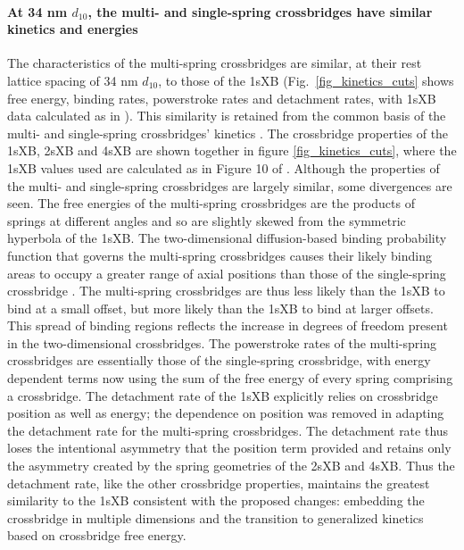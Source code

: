 \documentclass[]{article}
\begin{document}
\paragraph{At 34 nm $d_{10}$, the multi- and single-spring crossbridges have similar kinetics and energies} %
The characteristics of the multi-spring crossbridges are similar, at their rest lattice spacing of 34 nm $d_{10}$, to those of the 1sXB (Fig.~\ref{fig_kinetics_cuts} shows free energy, binding rates, powerstroke rates and detachment rates, with 1sXB data calculated as in \citet{Tanner2007}). 
This similarity is retained from the common basis of the multi- and single-spring crossbridges' kinetics \citep{Pate1989}.
The crossbridge properties of the 1sXB, 2sXB and 4sXB are shown together in figure \ref{fig_kinetics_cuts}, where the 1sXB values used are calculated as in Figure 10 of \citet{Tanner2007}. 
Although the properties of the multi- and single-spring crossbridges are largely similar, some divergences are seen. 
The free energies of the multi-spring crossbridges are the products of springs at different angles and so are slightly skewed from the symmetric hyperbola of the 1sXB.
The two-dimensional diffusion-based binding probability function that governs the multi-spring crossbridges causes their likely binding areas to occupy a greater range of axial positions than those of the single-spring crossbridge \citep{BergBook, DillBook}.
The multi-spring crossbridges are thus less likely than the 1sXB to bind at a small offset, but more likely than the 1sXB to bind at larger offsets. 
This spread of binding regions reflects the increase in degrees of freedom present in the two-dimensional crossbridges. 
The powerstroke rates of the multi-spring crossbridges are essentially those of the single-spring crossbridge, with energy dependent terms now using the  sum of the free energy of every spring comprising a crossbridge. 
The detachment rate of the 1sXB explicitly relies on crossbridge position as well as energy; the dependence on position was removed in adapting the detachment rate for the multi-spring crossbridges. 
The detachment rate thus loses the intentional asymmetry that the position term provided and retains only the asymmetry created by the spring geometries of the 2sXB and 4sXB. 
Thus the detachment rate, like the other crossbridge properties, maintains the greatest similarity to the 1sXB consistent with the proposed changes: embedding the crossbridge in multiple dimensions and the transition to generalized kinetics based on crossbridge free energy. 
\end{document}
